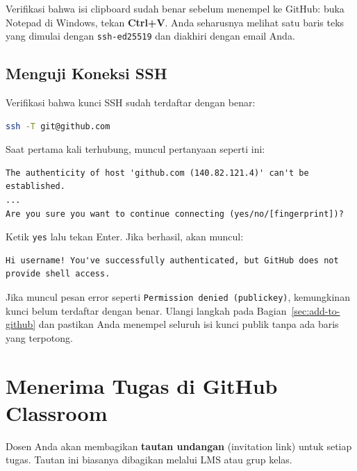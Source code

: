 \documentclass[
    a4paper,
    11pt,
    parskip=half
]{scrartcl}
\begin{document}
\begin{tipbox}
Verifikasi bahwa isi clipboard sudah benar sebelum menempel ke GitHub: buka Notepad di Windows, tekan \textbf{Ctrl+V}. Anda seharusnya melihat satu baris teks yang dimulai dengan \texttt{ssh-ed25519} dan diakhiri dengan email Anda.
\end{tipbox}

\subsection{Menguji Koneksi SSH}

Verifikasi bahwa kunci SSH sudah terdaftar dengan benar:

\begin{lstlisting}[language=bash]
ssh -T git@github.com
\end{lstlisting}

Saat pertama kali terhubung, muncul pertanyaan seperti ini:
\begin{lstlisting}
The authenticity of host 'github.com (140.82.121.4)' can't be established.
...
Are you sure you want to continue connecting (yes/no/[fingerprint])?
\end{lstlisting}

Ketik \texttt{yes} lalu tekan Enter. Jika berhasil, akan muncul:
\begin{lstlisting}
Hi username! You've successfully authenticated, but GitHub does not
provide shell access.
\end{lstlisting}

\begin{tipbox}
Jika muncul pesan error seperti \texttt{Permission denied (publickey)}, kemungkinan kunci belum terdaftar dengan benar. Ulangi langkah pada Bagian~\ref{sec:add-to-github} dan pastikan Anda menempel seluruh isi kunci publik tanpa ada baris yang terpotong.
\end{tipbox}

\section{Menerima Tugas di GitHub Classroom}
\label{sec:accept-assignment}

Dosen Anda akan membagikan \textbf{tautan undangan} (invitation link) untuk setiap tugas. Tautan ini biasanya dibagikan melalui LMS atau grup kelas.
\end{document}
